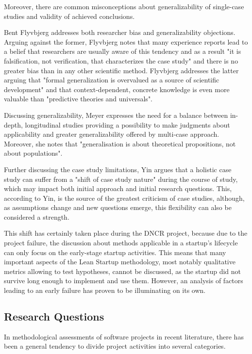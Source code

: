 \documentclass{article}
\begin{document}
Moreover, there are common misconceptions about generalizability of single-case studies and validity of achieved conclusions.

Bent Flyvbjerg \citep{flyvbjerg2006five} addresses both researcher bias and generalizability objections. Arguing against the former, Flyvbjerg notes that many experience reports lead to a belief that researchers are usually aware of this tendency and as a result "it is falsification, not verification, that characterizes the case study" and there is no greater bias than in any other scientific method. Flyvbjerg addresses the latter arguing that "formal generalization is overvalued as a source of scientific development" and that context-dependent, concrete knowledge is even more valuable than "predictive theories and universals".

Discussing generalizability, Meyer \citep{meyer2001case} expresses the need for a balance between in-depth, longitudinal studies providing a possibility to make judgments about applicability and greater generalizability offered by multi-case approach. Moreover, she notes that "generalisation is about theoretical propositions, not about populations".

Further discussing the case study limitations, Yin \citep{yin2013case} argues that a holistic case study can suffer from a "shift of case study nature" during the course of study, which may impact both initial approach and initial research questions. This, according to Yin, is the source of the greatest criticism of case studies, although, as assumptions change and new questions emerge, this flexibility can also be considered a strength.

This shift has certainly taken place during the DNCR project, because due to the project failure, the discussion about methods applicable in a startup's lifecycle can only focus on the early-stage startup activities. This means that many important aspects of the Lean Startup methodology, most notably qualitative metrics allowing to test hypotheses, cannot be discussed, as the startup did not survive long enough to implement and use them. However, an analysis of factors leading to an early failure has proven to be illuminating on its own.

\subsection{Research Questions}
In methodological assessments of software projects in recent literature, there has been a general tendency to divide project activities into several categories.
\end{document}
